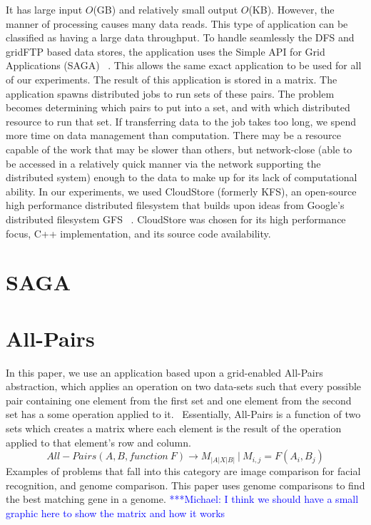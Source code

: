 \documentclass{rspublic}
\newcommand{\micnote}[1]{ {\textcolor{blue} { ***Michael: #1 }}} \else
\begin{document}
It has large input $O$(GB) and relatively small output $O$(KB).
However, the manner of processing causes many data reads.  This type of
application can be classified as having a large data throughput.  To
handle seamlessly the DFS and gridFTP based data stores, the application
uses the Simple API for Grid Applications (SAGA) ~\citep{saga_web}.
This allows the same exact application to be used for all of our
experiments.  The result of this application is stored in a matrix.  The
application spawns distributed jobs to run sets of these pairs.  The
problem becomes determining which pairs to put into a set, and with
which distributed resource to run that set.  If transferring data to the
job takes too long, we spend more time on data management than
computation.  There may be a resource capable of the work that may be
slower than others, but network-close (able to be accessed in a
relatively quick manner via the network supporting the distributed
system) enough to the data to make up for its lack of computational
ability.  In our experiments, we used CloudStore (formerly KFS), an
open-source high performance distributed filesystem that builds upon
ideas from Google's distributed filesystem GFS ~\citep{cloudstore_web}.
CloudStore was chosen for its high performance focus, C++
implementation, and its source code availability.

\section{SAGA}

\section{All-Pairs} In this paper, we use an application based upon a
grid-enabled All-Pairs abstraction, which applies an operation on two
data-sets such that every possible pair containing one element from the
first set and one element from the second set has a some operation
applied to it.~\citep{Interop, AllPairs}  Essentially, All-Pairs is a
function of two sets which creates a matrix where each element is the
result of the operation applied to that element's row and column.
\begin{equation} All-Pairs(A, B, function\ F) \rightarrow M_{|A|X|B|}\
|\ M_{i,j} = F(A_{i},B_{j}) \end{equation} Examples of problems that
fall into this category are image comparison for facial recognition, and
genome comparison.  This paper uses genome comparisons to find the best
matching gene in a genome. \micnote{I think we should have a small
graphic here to show the matrix and how it works}
\end{document}
